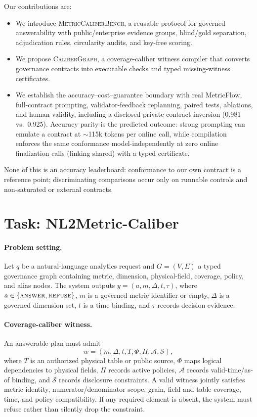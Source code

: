 \documentclass[letterpaper]{article}
\begin{document}
Our contributions are:
\begin{itemize}
    \item We introduce \textsc{MetricCaliberBench}, a reusable protocol for governed answerability with public/enterprise evidence groups, blind/gold separation, adjudication rules, circularity audits, and key-free scoring.
    \item We propose \textsc{CaliberGraph}, a coverage-caliber witness compiler that converts governance contracts into executable checks and typed missing-witness certificates.
    \item We establish the accuracy--cost--guarantee boundary with real MetricFlow, full-contract prompting, validator-feedback replanning, paired tests, ablations, and human validity, including a disclosed private-contract inversion (0.981 vs.\ 0.925). Accuracy parity is the predicted outcome: strong prompting can emulate a contract at $\sim$115k tokens per online call, while compilation enforces the same conformance model-independently at zero online finalization calls (linking shared) with a typed certificate.
\end{itemize}

None of this is an accuracy leaderboard: conformance to our own contract is a reference point; discriminating comparisons occur only on runnable controls and non-saturated or external contracts.

\section{Task: NL2Metric-Caliber}

\paragraph{Problem setting.}
Let $q$ be a natural-language analytics request and $G=(V,E)$ a typed governance graph containing metric, dimension, physical-field, coverage, policy, and alias nodes. The system outputs $y=(a,m,\Delta,t,\tau)$, where $a\in\{\textsc{answer},\textsc{refuse}\}$, $m$ is a governed metric identifier or empty, $\Delta$ is a governed dimension set, $t$ is a time binding, and $\tau$ records decision evidence.

\paragraph{Coverage-caliber witness.}
An answerable plan must admit
\[
w=(m,\Delta,t,T,\Phi,\Pi,\mathcal{A},\mathcal{S}),
\]
where $T$ is an authorized physical table or public source, $\Phi$ maps logical dependencies to physical fields, $\Pi$ records active policies, $\mathcal{A}$ records valid-time/as-of binding, and $\mathcal{S}$ records disclosure constraints. A valid witness jointly satisfies metric identity, numerator/denominator scope, grain, field and table coverage, time, and policy compatibility. If any required element is absent, the system must refuse rather than silently drop the constraint.
\end{document}
